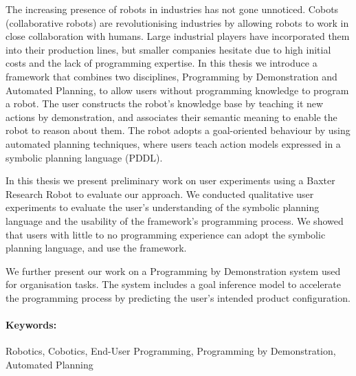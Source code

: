 The increasing presence of robots in industries has not gone unnoticed. 
Cobots (collaborative robots) are revolutionising industries by allowing robots to work in close collaboration with humans.
Large industrial players have incorporated them into their production lines, but smaller companies hesitate due to high initial costs and the lack of programming expertise. 
In this thesis we introduce a framework that combines two disciplines, Programming by Demonstration and Automated Planning, to allow users without programming knowledge to program a robot. 
The user constructs the robot's knowledge base by teaching it new actions by demonstration, and associates their semantic meaning to enable the robot to reason about them. 
The robot adopts a goal-oriented behaviour by using automated planning techniques, where users teach action models expressed in a symbolic planning language (PDDL).

In this thesis we present preliminary work on user experiments using a Baxter Research Robot to evaluate our approach.
We conducted qualitative user experiments to evaluate the user's understanding of the symbolic planning language and the usability of the framework's programming process.
We showed that users with little to no programming experience can adopt the symbolic planning language, and use the framework.

We further present our work on a Programming by Demonstration system used for organisation tasks.
The system includes a goal inference model to accelerate the programming process by predicting the user's intended product configuration.

\paragraph{Keywords:} Robotics, Cobotics, End-User Programming, Programming by Demonstration, Automated Planning